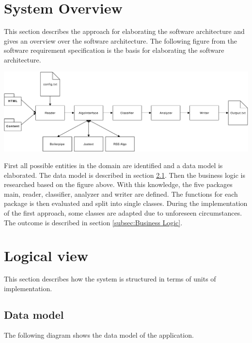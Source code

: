 \section{System Overview}

This section describes the approach for elaborating the software architecture and gives an overview over the software architecture. 
The following figure from the software requirement specification is the basis for elaborating the software architecture.


\includegraphics[width=15cm]{Figures/AppOverview.pdf}


First all possible entities in the domain are identified and a data model is elaborated. The data model is described in section \ref{subsec:Data model}. Then the business logic is researched based on the figure above. With this knowledge, the five packages main, reader, classifier, analyzer and writer are defined. The functions for each package is then evaluated and split into single classes. During the implementation of the first approach, some classes are adapted due to unforeseen circumstances. The outcome is described in section \ref{subsec:Business Logic}.
\pagebreak

\section{Logical view}

This section describes how the system is structured in terms of units of implementation.


\subsection{Data model}
\label{subsec:Data model}

The following diagram shows the data model of the application. 

